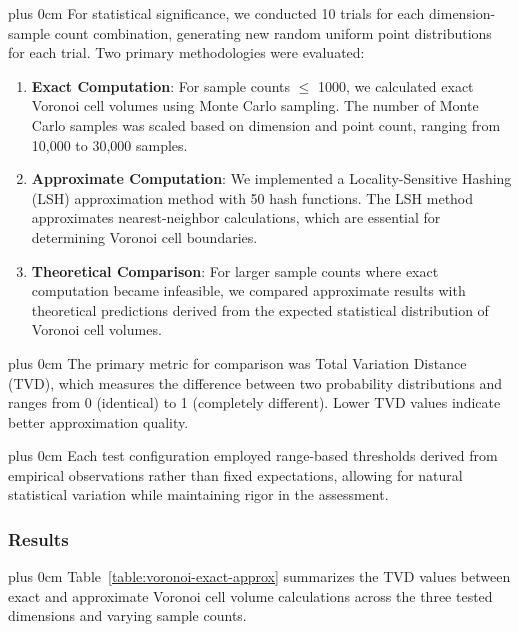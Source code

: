 \documentclass[11pt,a4paper]{article}
\newcommand{\justifytext}{\leftskip=0pt \rightskip=0pt plus 0cm}
\begin{document}
\justifytext
For statistical significance, we conducted 10 trials for each dimension-sample count combination, generating new random uniform point distributions for each trial. Two primary methodologies were evaluated:

\begin{enumerate}
    \item \textbf{Exact Computation}: For sample counts $\leq$ 1000, we calculated exact Voronoi cell volumes using Monte Carlo sampling. The number of Monte Carlo samples was scaled based on dimension and point count, ranging from 10,000 to 30,000 samples.
    
    \item \textbf{Approximate Computation}: We implemented a Locality-Sensitive Hashing (LSH) approximation method with 50 hash functions. The LSH method approximates nearest-neighbor calculations, which are essential for determining Voronoi cell boundaries.
    
    \item \textbf{Theoretical Comparison}: For larger sample counts where exact computation became infeasible, we compared approximate results with theoretical predictions derived from the expected statistical distribution of Voronoi cell volumes.
\end{enumerate}

\justifytext
The primary metric for comparison was Total Variation Distance (TVD), which measures the difference between two probability distributions and ranges from 0 (identical) to 1 (completely different). Lower TVD values indicate better approximation quality.

\justifytext
Each test configuration employed range-based thresholds derived from empirical observations rather than fixed expectations, allowing for natural statistical variation while maintaining rigor in the assessment.

\subsubsection{Results}

\justifytext
Table~\ref{table:voronoi-exact-approx} summarizes the TVD values between exact and approximate Voronoi cell volume calculations across the three tested dimensions and varying sample counts.
\end{document}

